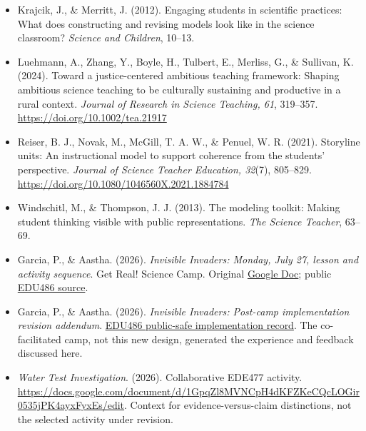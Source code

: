 \begin{itemize}
\item Krajcik, J., \& Merritt, J. (2012). Engaging students in scientific practices: What does constructing and revising models look like in the science classroom? \emph{Science and Children}, 10--13.
\item Luehmann, A., Zhang, Y., Boyle, H., Tulbert, E., Merliss, G., \& Sullivan, K. (2024). Toward a justice-centered ambitious teaching framework: Shaping ambitious science teaching to be culturally sustaining and productive in a rural context. \emph{Journal of Research in Science Teaching, 61}, 319--357. \url{https://doi.org/10.1002/tea.21917}
\item Reiser, B. J., Novak, M., McGill, T. A. W., \& Penuel, W. R. (2021). Storyline units: An instructional model to support coherence from the students' perspective. \emph{Journal of Science Teacher Education, 32}(7), 805--829. \url{https://doi.org/10.1080/1046560X.2021.1884784}
\item Windschitl, M., \& Thompson, J. J. (2013). The modeling toolkit: Making student thinking visible with public representations. \emph{The Science Teacher}, 63--69.
\end{itemize}
\begin{itemize}
\item Garcia, P., \& Aastha. (2026). \emph{Invisible Invaders: Monday, July 27, lesson and activity sequence}. Get Real! Science Camp. Original \href{https://docs.google.com/document/d/1jc_dSOKXVhSoSbvfbivXlgfYOxrrJ2L6KwbR7LQZCLc/edit}{Google Doc}; public \href{https://github.com/pzg8794/EDU486/blob/main/assignments/03-camp-unit-plan/monday-water-pathways-and-first-model.md}{EDU486 source}.
\item Garcia, P., \& Aastha. (2026). \emph{Invisible Invaders: Post-camp implementation revision addendum}. \href{https://github.com/pzg8794/EDU486/blob/main/assignments/03-camp-unit-plan/post-camp-implementation-revision-addendum.md}{EDU486 public-safe implementation record}. The co-facilitated camp, not this new design, generated the experience and feedback discussed here.
\item \emph{Water Test Investigation}. (2026). Collaborative EDE477 activity. \url{https://docs.google.com/document/d/1GpqZl8MVNCpH4dKFZKeCQcLOGir0535jPK4ayxFyxEs/edit}. Context for evidence-versus-claim distinctions, not the selected activity under revision.
\end{itemize}
